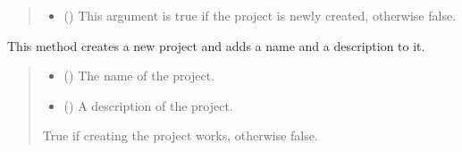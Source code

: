 \documentclass[letterpaper,10pt,english]{sphinxmanual}
\begin{document}
\begin{fulllineitems}
\begin{fulllineitems}
\begin{quote}
\begin{description}
\begin{itemize}
\item {} 
\sphinxAtStartPar
{} () \textendash{} This argument is true if the project is newly created, otherwise false.

\end{itemize}

\end{description}\end{quote}

\end{fulllineitems}


\begin{fulllineitems}
\label{\detokenize{apidoc/src.osm_configurator.model.project:src.osm_configurator.model.project.active_project.ActiveProject.create}}
\pysigstartsignatures
{}
\pysigstopsignatures
\sphinxAtStartPar
This method creates a new project and adds a name and a description to it.
\begin{quote}\begin{description}
\begin{itemize}
\item {} 
\sphinxAtStartPar
{} () \textendash{} The name of the project.

\item {} 
\sphinxAtStartPar
{} () \textendash{} A description of the project.

\end{itemize}

\sphinxAtStartPar
True if creating the project works, otherwise false.

\sphinxAtStartPar
{}

\end{description}\end{quote}


\end{fulllineitems}
\end{fulllineitems}
\end{document}

